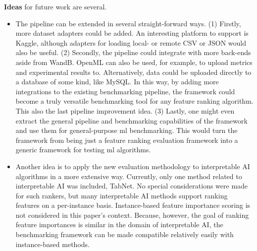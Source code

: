 \documentclass[../main.tex]{subfiles}
\begin{document}
\textbf{Ideas} for future work are several.
\begin{itemize}
    \item The pipeline can be extended in several straight-forward ways. (1) Firstly, more dataset adapters could be added. An interesting platform to support is Kaggle, although adapters for loading local- or remote CSV or JSON would also be useful. (2) Secondly, the pipeline could integrate with more back-ends aside from WandB. OpenML can also be used, for example, to upload metrics and experimental results to. Alternatively, data could be uploaded directly to a database of some kind, like MySQL. In this way, by adding more integrations to the existing benchmarking pipeline, the framework could become a truly versatile benchmarking tool for any feature ranking algorithm. This also the last pipeline improvement idea. (3) Lastly, one might even extract the general pipeline and benchmarking capabilities of the framework and use them for general-purpose \gls{ml} benchmarking. This would turn the framework from being just a feature ranking evaluation framework into a generic framework for testing \gls{ml} algorithms. 
    \item Another idea is to apply the new evaluation methodology to interpretable AI algorithms in a more extensive way. Currently, only one method related to interpretable AI was included, TabNet. No special considerations were made for such rankers, but many interpretable AI methods support ranking features on a per-instance basis. Instance-based feature importance scoring is not considered in this paper's context. Because, however, the goal of ranking feature importances is similar in the domain of interpretable AI, the benchmarking framework can be made compatible relatively easily with instance-based methods.
\end{itemize}

\biblio
\end{document}
